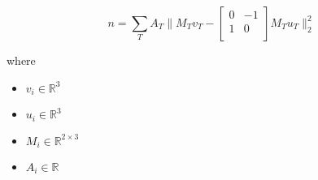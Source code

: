 \documentclass[12pt]{article}
\begin{document}
\[
\textit{n} = \sum_\textit{T} \textit{A}_{ \textit{T} }\|\textit{M}_{ \textit{T} }\textit{v}_{ \textit{T} } - \begin{bmatrix}
0 & -1\\
1 & 0\\
\end{bmatrix}\textit{M}_{ \textit{T} }\textit{u}_{ \textit{T} }\|_2^{2}
\]

where
\begin{itemize}
\item $\textit{v}_{\textit{i}} \in \mathbb{R}^{ 3}$
\item $\textit{u}_{\textit{i}} \in \mathbb{R}^{ 3}$
\item $\textit{M}_{\textit{i}} \in \mathbb{R}^{ 2 \times 3 }$
\item $\textit{A}_{\textit{i}} \in \mathbb{{R}}$
\end{itemize}
\end{document}
